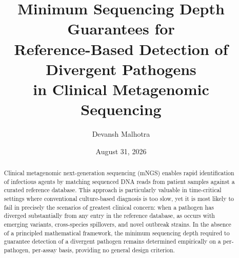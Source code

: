 \documentclass[12pt]{article}
\title{\vspace{-2.4cm}Minimum Sequencing Depth Guarantees for\\
       Reference-Based Detection of Divergent Pathogens\\
       in Clinical Metagenomic Sequencing}
\author{Devansh Malhotra}
\date{August 31, 2026}
\theoremstyle{definition}
\theoremstyle{plain}
\begin{document}
\maketitle
\vspace{-0.6cm}

\begin{abstract}
\small
Clinical metagenomic next-generation sequencing (mNGS) enables rapid
identification of infectious agents by matching sequenced DNA reads from
patient samples against a curated reference database. This approach is
particularly valuable in time-critical settings where conventional
culture-based diagnosis is too slow, yet it is most likely to fail in
precisely the scenarios of greatest clinical concern: when a pathogen has
diverged substantially from any entry in the reference database, as occurs
with emerging variants, cross-species spillovers, and novel outbreak
strains. In the absence of a principled mathematical framework, the minimum
sequencing depth required to guarantee detection of a divergent pathogen
remains determined empirically on a per-pathogen, per-assay basis, providing
no general design criterion.


\end{abstract}
\end{document}
